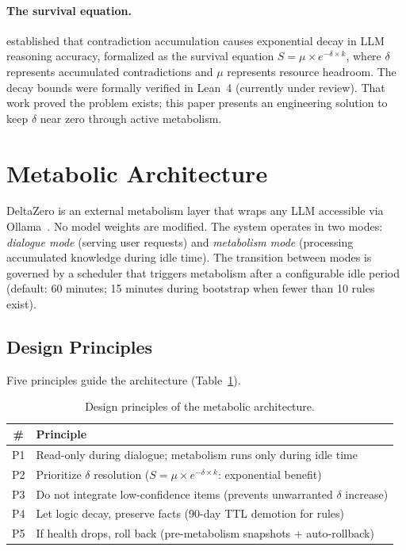 \documentclass[11pt,a4paper]{article}
\begin{document}
\paragraph{The survival equation.}
\citet{sunagawa2026collapse} established that contradiction accumulation causes exponential decay in LLM reasoning accuracy, formalized as the survival equation $S = \mu \times e^{-\delta \times k}$, where $\delta$ represents accumulated contradictions and $\mu$ represents resource headroom.
The decay bounds were formally verified in Lean~4 (currently under review).
That work proved the problem exists; this paper presents an engineering solution to keep $\delta$ near zero through active metabolism.

\section{Metabolic Architecture}
\label{sec:architecture}

DeltaZero is an external metabolism layer that wraps any LLM accessible via Ollama~\citep{ollama}.
No model weights are modified.
The system operates in two modes: \emph{dialogue mode} (serving user requests) and \emph{metabolism mode} (processing accumulated knowledge during idle time).
The transition between modes is governed by a scheduler that triggers metabolism after a configurable idle period (default: 60 minutes; 15 minutes during bootstrap when fewer than 10 rules exist).

\subsection{Design Principles}

Five principles guide the architecture (Table~\ref{tab:principles}).

\begin{table}[htbp]
\centering
\caption{Design principles of the metabolic architecture.}
\label{tab:principles}
\begin{tabular}{cl}
\toprule
\# & Principle \\
\midrule
P1 & Read-only during dialogue; metabolism runs only during idle time \\
P2 & Prioritize $\delta$ resolution ($S = \mu \times e^{-\delta \times k}$: exponential benefit) \\
P3 & Do not integrate low-confidence items (prevents unwarranted $\delta$ increase) \\
P4 & Let logic decay, preserve facts (90-day TTL demotion for rules) \\
P5 & If health drops, roll back (pre-metabolism snapshots + auto-rollback) \\
\bottomrule
\end{tabular}
\end{table}
\end{document}
